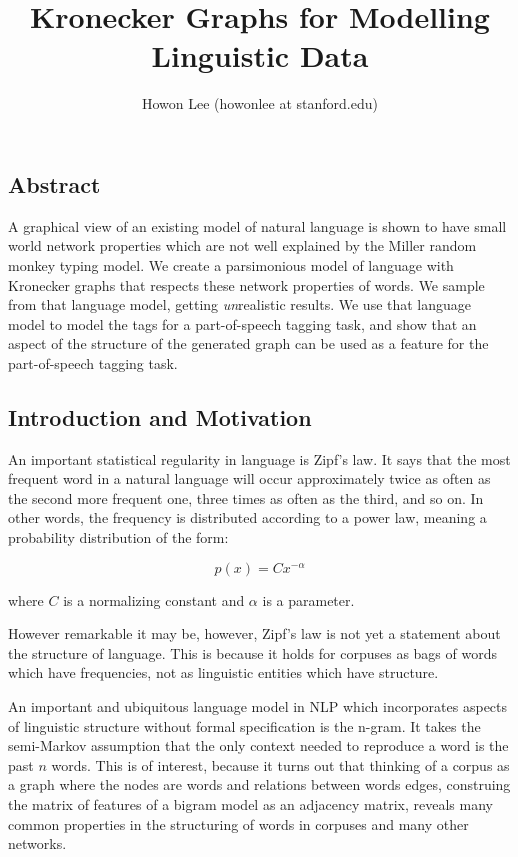 \documentclass[12pt]{article}
\begin{document}
\title{Kronecker Graphs for Modelling Linguistic Data}
\author{Howon Lee (howonlee at stanford.edu)}
\maketitle

\subsection*{Abstract}
A graphical view of an existing model of natural language is shown to have small world network properties which are not well explained by the Miller random monkey typing model. We create a parsimonious model of language with Kronecker graphs that respects these network properties of words. We sample from that language model, getting \emph{un}realistic results. We use that language model to model the tags for a part-of-speech tagging task, and show that an aspect of the structure of the generated graph can be used as a feature for the part-of-speech tagging task.

\subsection*{Introduction and Motivation}

An important statistical regularity in language is Zipf's law. It says that the most frequent word in a natural language will occur approximately twice as often as the second more frequent one, three times as often as the third, and so on. In other words, the frequency is distributed according to a power law, meaning a probability distribution of the form: %

$$p(x) = Cx^{-\alpha} $$

where $C$ is a normalizing constant and $\alpha$ is a parameter.

However remarkable it may be, however, Zipf's law is not yet a statement about the structure of language. This is because it holds for corpuses as bags of words which have frequencies, not as linguistic entities which have structure. \cite{smallworldlang}

An important and ubiquitous language model in NLP which incorporates aspects of linguistic structure without formal specification is the n-gram. It takes the semi-Markov assumption that the only context needed to reproduce a word is the past $n$ words. This is of interest, because it turns out that thinking of a corpus as a graph where the nodes are words and relations between words edges, construing the matrix of features of a bigram model as an adjacency matrix, reveals many common properties in the structuring of words in corpuses and many other networks.
\end{document}
